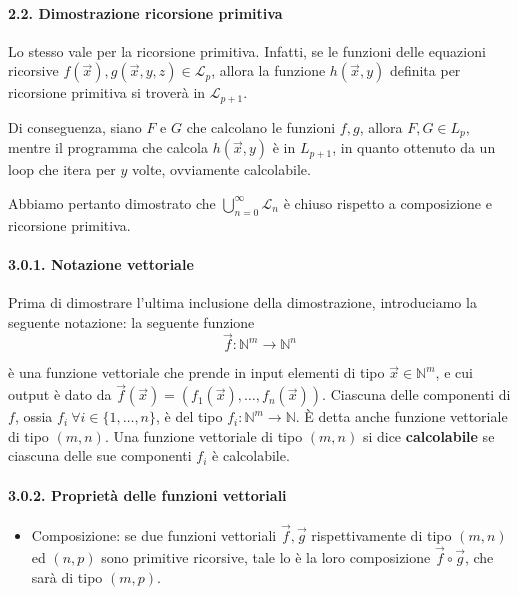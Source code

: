 	\paragraph{2.2. Dimostrazione ricorsione primitiva} Lo stesso vale per la ricorsione primitiva. Infatti, se le funzioni delle equazioni ricorsive $f(\vec{x}), g(\vec{x}, y, z) \in \mathcal L_p$, allora la funzione $h(\vec{x}, y)$ definita per ricorsione primitiva si troverà in $\mathcal L_{p+1}$.
	
	Di conseguenza, siano $F$ e $G$ che calcolano le funzioni $f, g$, allora $F, G \in L_p$, mentre il programma che calcola $h(\vec{x}, y)$ è in $L_{p+1}$, in quanto ottenuto da un loop che itera per $y$ volte, ovviamente calcolabile.
	
	Abbiamo pertanto dimostrato che $\bigcup_{n=0}^\infty \mathcal{L}_n$ è chiuso rispetto a composizione e ricorsione primitiva.
	
	\paragraph{3.0.1. Notazione vettoriale} Prima di dimostrare l'ultima inclusione della dimostrazione, introduciamo la seguente notazione:
	la seguente funzione 
	$$
	\vec{f}: \mathbb{N}^m \to \mathbb{N}^n
	$$
	
	è una funzione vettoriale che prende in input elementi di tipo $\vec{x} \in \mathbb{N}^m$, e cui output è dato da $\vec{f}(\vec{x}) = (f_1(\vec{x}), \dots, f_n(\vec{x}))$. Ciascuna delle componenti di $f$, ossia $f_i \ \forall i \in \{1,\dots, n \}$, è del tipo $f_i: \mathbb{N}^m \to \mathbb{N}$.
	È detta anche funzione vettoriale di tipo $(m,n)$.
	Una funzione vettoriale di tipo $(m,n)$ si dice \textbf{calcolabile} se ciascuna delle sue componenti $f_i$ è calcolabile.
	
	\paragraph{3.0.2. Proprietà delle funzioni vettoriali}
	\begin{itemize}
		\item Composizione: se due funzioni vettoriali $\vec{f}, \vec{g}$ rispettivamente di tipo $(m,n)$ ed $(n,p)$ sono primitive ricorsive, tale lo è la loro composizione $\vec{f} \circ \vec{g}$, che sarà di tipo $(m,p)$.
	\end{itemize}
	